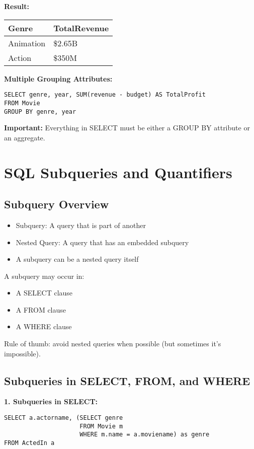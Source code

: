 \documentclass{article}
\begin{document}
\textbf{Result:}
\begin{tabular}{ll}
\hline
Genre & TotalRevenue \\
\hline
Animation & \$2.65B \\
Action & \$350M \\
\hline
\end{tabular}

\textbf{Multiple Grouping Attributes:}
\begin{verbatim}
SELECT genre, year, SUM(revenue - budget) AS TotalProfit
FROM Movie
GROUP BY genre, year
\end{verbatim}

\textbf{Important:} Everything in SELECT must be either a GROUP BY attribute or an aggregate.

\section*{SQL Subqueries and Quantifiers}

\subsection*{Subquery Overview}
\begin{itemize}
    \item Subquery: A query that is part of another
    \item Nested Query: A query that has an embedded subquery
    \item A subquery can be a nested query itself
\end{itemize}

A subquery may occur in:
\begin{itemize}
    \item A SELECT clause
    \item A FROM clause
    \item A WHERE clause
\end{itemize}

Rule of thumb: avoid nested queries when possible (but sometimes it's impossible).

\subsection*{Subqueries in SELECT, FROM, and WHERE}

\textbf{1. Subqueries in SELECT:}

\begin{verbatim}
SELECT a.actorname, (SELECT genre
                     FROM Movie m
                     WHERE m.name = a.moviename) as genre
FROM ActedIn a
\end{verbatim}
\end{document}
